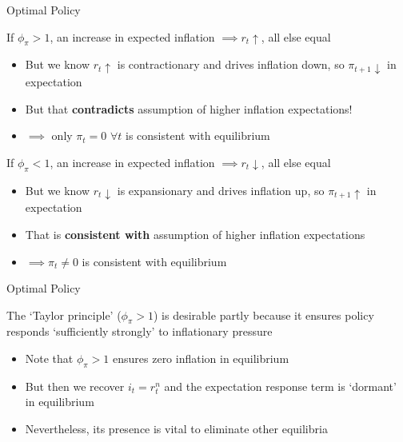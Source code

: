 
	
\begin{frame}{Optimal Policy}

If $\phi_{\pi}>1$, an increase in expected inflation $\implies r_{t}\uparrow$, all else equal
\begin{itemize}
\item	But we know $r_{t}\uparrow$ is contractionary and drives inflation down, so $\pi_{t+1}\downarrow$ in expectation
\item	But that \textbf{contradicts} assumption of higher inflation expectations!
\item	$\implies$ only $\pi_{t}=0$ $\forall t$ is consistent with equilibrium
\end{itemize}

\vspace{2mm}
If $\phi_{\pi}<1$, an increase in expected inflation $\implies r_{t}\downarrow$, all else equal
\begin{itemize}
\item	But we know $r_{t}\downarrow$ is expansionary and drives inflation up, so $\pi_{t+1}\uparrow$ in expectation
\item	That is \textbf{consistent with} assumption of higher inflation expectations
\item	$\implies \pi_{t}\neq 0$ is consistent with equilibrium
\end{itemize}

\end{frame}


	
\begin{frame}{Optimal Policy}


The `Taylor principle' ($\phi_{\pi}>1$) is desirable partly because it ensures policy responds `sufficiently strongly' to inflationary pressure
\begin{itemize}
\item	Note that $\phi_{\pi}>1$ ensures zero inflation in equilibrium
\item	But then we recover $i_{t}=r^{n}_{t}$ and the expectation response term is `dormant' in equilibrium
\item	Nevertheless, its presence is vital to eliminate other equilibria
\end{itemize}

\end{frame}


